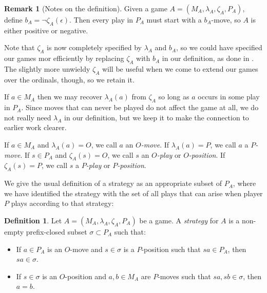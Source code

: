 \documentclass[11pt]{article} %
\theoremstyle{plain} %
\theoremstyle{definition} %
\newtheorem{definition}[theorem]{Definition}
\newtheorem{remark}[theorem]{Remark}
\theoremstyle{exercisestyle}
\newcommand{\emptyplay}{\epsilon}
\begin{document}
\begin{remark}[Notes on the definition]
  Given a game $A=(M_A,\lambda_A,\zeta_A,P_A)$, define $b_A=\neg\zeta_A(\emptyplay)$.  Then every play in $P_A$ must start with a $b_A$-move, so $A$ is either positive or negative.

  Note that $\zeta_A$ is now completely specified by $\lambda_A$ and $b_A$, so we could have specified our games mor efficiently by replacing $\zeta_A$ with $b_A$ in our definition, as done in \cite{martinsthesis}.  The slightly more unwieldy $\zeta_A$ will be useful when we come to extend our games over the ordinals, though, so we retain it.

  If $a\in M_A$ then we may recover $\lambda_A(a)$ from $\zeta_A$ so long as $a$ occurs in some play in $P_A$.  Since moves that can never be played do not affect the game at all, we do not really need $\lambda_A$ in our definition, but we keep it to make the connection to earlier work clearer.

  If $a\in M_A$ and $\lambda_A(a)=O$, we call $a$ an \emph{$O$-move}.  If $\lambda_A(a)=P$, we call $a$ a \emph{$P$-move}.  If $s\in P_A$ and $\zeta_A(s)=O$, we call $s$ an \emph{$O$-play} or \emph{$O$-position}.  If $\zeta_A(s)=P$, we call $s$ a \emph{$P$-play} or \emph{$P$-position}.

\end{remark}

We give the usual definition of a strategy as an appropriate subset of $P_A$, where we have identified the strategy with the set of all plays that can arise when player $P$ plays according to that strategy:

\begin{definition}
  Let $A=(M_A,\lambda_A,\zeta_A,P_A)$ be a game.  A \emph{strategy} for $A$ is a non-empty prefix-closed subset $\sigma\subset P_A$ such that:
  \begin{itemize}
    \item If $a\in P_A$ is an $O$-move and $s\in\sigma$ is a $P$-position such that $sa\in P_A$, then $sa\in\sigma$.
    \item If $s\in\sigma$ is an $O$-position and $a,b\in M_A$ are $P$-moves such that $sa,sb\in\sigma$, then $a=b$.
  \end{itemize}
\end{definition}
\end{document}

